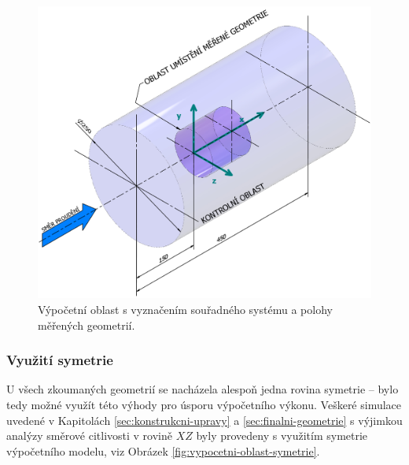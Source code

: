             \begin{figure}[ht!]
                \centering
                \includegraphics[width=\textwidth]{300_VYPOCETNI_MODEL/Vypocetni_oblast.png}
                \caption{Výpočetní oblast s vyznačením souřadného systému a polohy měřených geometrií.}
                \label{fig:vypocetni-oblast}
            \end{figure}
        
        \subsubsection{Využití symetrie}
            U všech zkoumaných geometrií se nacházela alespoň jedna rovina symetrie – bylo tedy možné využít této výhody pro úsporu výpočetního výkonu. Veškeré simulace uvedené v Kapitolách \ref{sec:konstrukcni-upravy} a \ref{sec:finalni-geometrie} s výjimkou analýzy směrové citlivosti v rovině $XZ$ byly provedeny s využitím symetrie výpočetního modelu, viz Obrázek \ref{fig:vypocetni-oblast-symetrie}.
            
